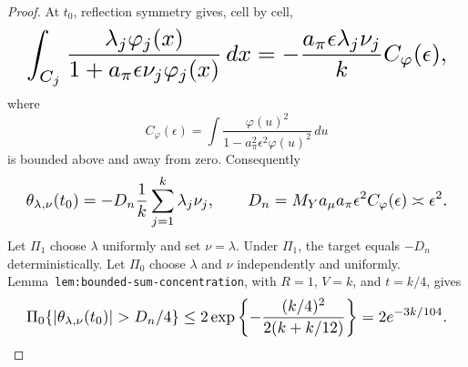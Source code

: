 \documentclass{article}
\begin{document}
\begin{proof}
At \(t_0\), reflection symmetry gives, cell by cell,
\[
\makebox[\linewidth][c]{\resizebox{0.98\linewidth}{!}{\par\noindent \makebox[\linewidth][c]{\resizebox{0.98\linewidth}{!}{\(\displaystyle \displaystyle \int_{C_j}\frac{\lambda_j\varphi_j(x)}{1+a_\pi\epsilon\nu_j\varphi_j(x)}\,dx=-\frac{a_\pi\epsilon\lambda_j\nu_j}{k}C_\varphi(\epsilon),\)}}\par\noindent}}
\]
where
\[
C_\varphi(\epsilon)=\int\frac{\varphi(u)^2}{1-a_\pi^2\epsilon^2\varphi(u)^2}\,du
\]
is bounded above and away from zero. Consequently
\[
\makebox[\linewidth][c]{\resizebox{0.98\linewidth}{!}{\par\noindent \makebox[\linewidth][c]{\resizebox{0.98\linewidth}{!}{\(\displaystyle \displaystyle \theta_{\lambda,\nu}(t_0)=-D_n\frac1k\sum_{j=1}^k\lambda_j\nu_j,\qquad D_n=M_Ya_\mu a_\pi\epsilon^2C_\varphi(\epsilon)\asymp\epsilon^2.\)}}\par\noindent}}
\]
Let \(\Pi_1\) choose \(\lambda\) uniformly and set \(\nu=\lambda\). Under \(\Pi_1\), the target equals \(-D_n\) deterministically. Let \(\Pi_0\) choose \(\lambda\) and \(\nu\) independently and uniformly. Lemma~\texttt{lem:bounded-sum-concentration}, with \(R=1\), \(V=k\), and \(t=k/4\), gives
\[
\makebox[\linewidth][c]{\resizebox{0.98\linewidth}{!}{\par\noindent \makebox[\linewidth][c]{\resizebox{0.98\linewidth}{!}{\(\displaystyle \displaystyle \Pi_0\{\lvert\theta_{\lambda,\nu}(t_0)\rvert>D_n/4\}\le2\exp\left\{-\frac{(k/4)^2}{2(k+k/12)}\right\}=2e^{-3k/104}.\)}}\par\noindent}}
\]


\end{proof}
\end{document}
